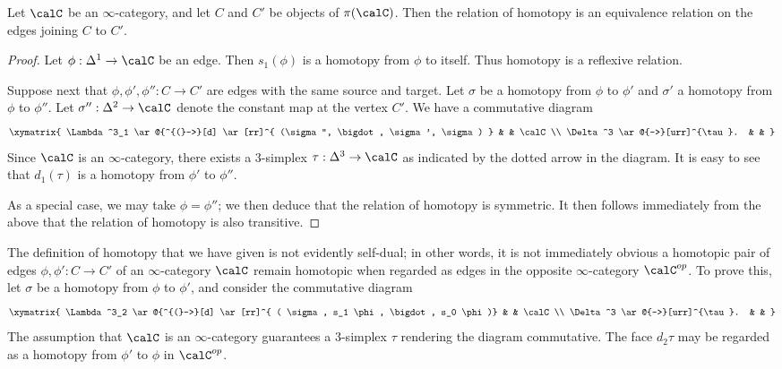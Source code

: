 \begin{proposition}\label{extneeded}
Let $\calC$ be an $\infty$-category, and let $C$ and $C'$ be objects of
$\pi(\calC)$. Then the relation of homotopy is an equivalence relation
on the edges joining $C$ to $C'$.
\end{proposition}

\begin{proof}
Let $\phi: \Delta^1 \rightarrow \calC$ be an edge. Then $s_1(\phi)$ is a homotopy from $\phi$ to
itself. Thus homotopy is a reflexive relation.

Suppose next that $\phi, \phi', \phi'': C \rightarrow C'$ are edges with the same source and target. Let $\sigma$
be a homotopy from $\phi$ to $\phi'$ and $\sigma'$ a homotopy from
$\phi$ to $\phi''$. Let $\sigma'': \Delta^2 \rightarrow \calC$ denote the
constant map at the vertex $C'$. 
We have a commutative diagram
$$ \xymatrix{ \Lambda^3_1 \ar@{^{(}->}[d] \ar[rr]^{ (\sigma'', \bigdot, \sigma', \sigma) } & & \calC \\
\Delta^3 \ar@{-->}[urr]^{\tau}. & & }$$
Since $\calC$ is an $\infty$-category, there exists a $3$-simplex $\tau: \Delta^3 \rightarrow \calC$ as indicated by the dotted arrow in the diagram. It is easy to see that
$d_1(\tau)$ is a homotopy from $\phi'$ to $\phi''$.

As a special case, we may take $\phi=\phi''$; we then deduce that
the relation of homotopy is symmetric. It then follows immediately
from the above that the relation of homotopy is also transitive.
\end{proof}

\begin{remark}\label{cello}
The definition of homotopy that we have given is not evidently self-dual; in other words, 
it is not immediately obvious a homotopic pair of edges $\phi, \phi': C \rightarrow C'$ of an $\infty$-category $\calC$ remain homotopic when regarded as edges in the opposite $\infty$-category $\calC^{op}$. To prove this, let $\sigma$ be a homotopy from $\phi$ to $\phi'$, and consider
the commutative diagram
$$ \xymatrix{ \Lambda^3_2 \ar@{^{(}->}[d] \ar[rr]^{ ( \sigma, s_1 \phi, \bigdot, s_0 \phi)} & & \calC \\
\Delta^3 \ar@{-->}[urr]^{\tau}. & & }$$
The assumption that $\calC$ is an $\infty$-category guarantees a $3$-simplex
$\tau$ rendering the diagram commutative. The face $d_2 \tau$ may be regarded as a homotopy
from $\phi'$ to $\phi$ in $\calC^{op}$.
\end{remark}

